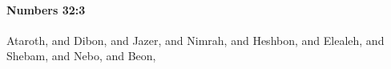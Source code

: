 
		\paragraph{Numbers 32:3} %
			\label{NUMBERS-32-3}

			Ataroth, and Dibon, and Jazer, and Nimrah, and Heshbon, and Elealeh, and Shebam, and Nebo, and Beon,


